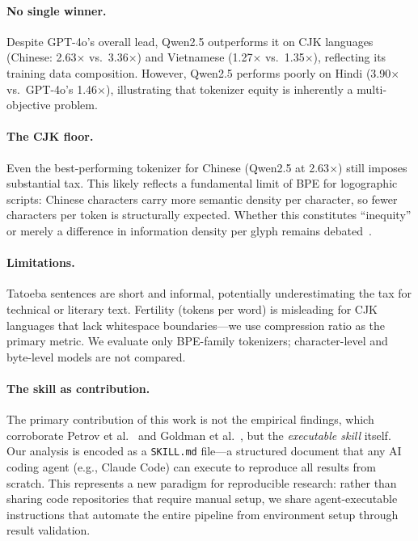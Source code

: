 \documentclass[11pt]{article}
\begin{document}
\paragraph{No single winner.}
Despite GPT-4o's overall lead, Qwen2.5 outperforms it on CJK languages (Chinese: 2.63$\times$ vs.\ 3.36$\times$) and Vietnamese (1.27$\times$ vs.\ 1.35$\times$), reflecting its training data composition.
However, Qwen2.5 performs poorly on Hindi (3.90$\times$ vs.\ GPT-4o's 1.46$\times$), illustrating that tokenizer equity is inherently a multi-objective problem.

\paragraph{The CJK floor.}
Even the best-performing tokenizer for Chinese (Qwen2.5 at 2.63$\times$) still imposes substantial tax.
This likely reflects a fundamental limit of BPE for logographic scripts: Chinese characters carry more semantic density per character, so fewer characters per token is structurally expected.
Whether this constitutes ``inequity'' or merely a difference in information density per glyph remains debated~\cite{goldman2024tokenization}.

\paragraph{Limitations.}
Tatoeba sentences are short and informal, potentially underestimating the tax for technical or literary text.
Fertility (tokens per word) is misleading for CJK languages that lack whitespace boundaries---we use compression ratio as the primary metric.
We evaluate only BPE-family tokenizers; character-level and byte-level models are not compared.

\paragraph{The skill as contribution.}
The primary contribution of this work is not the empirical findings, which corroborate Petrov et al.~\cite{petrov2023language} and Goldman et al.~\cite{goldman2024tokenization}, but the \emph{executable skill} itself.
Our analysis is encoded as a \texttt{SKILL.md} file---a structured document that any AI coding agent (e.g., Claude Code) can execute to reproduce all results from scratch.
This represents a new paradigm for reproducible research: rather than sharing code repositories that require manual setup, we share agent-executable instructions that automate the entire pipeline from environment setup through result validation.
\end{document}
